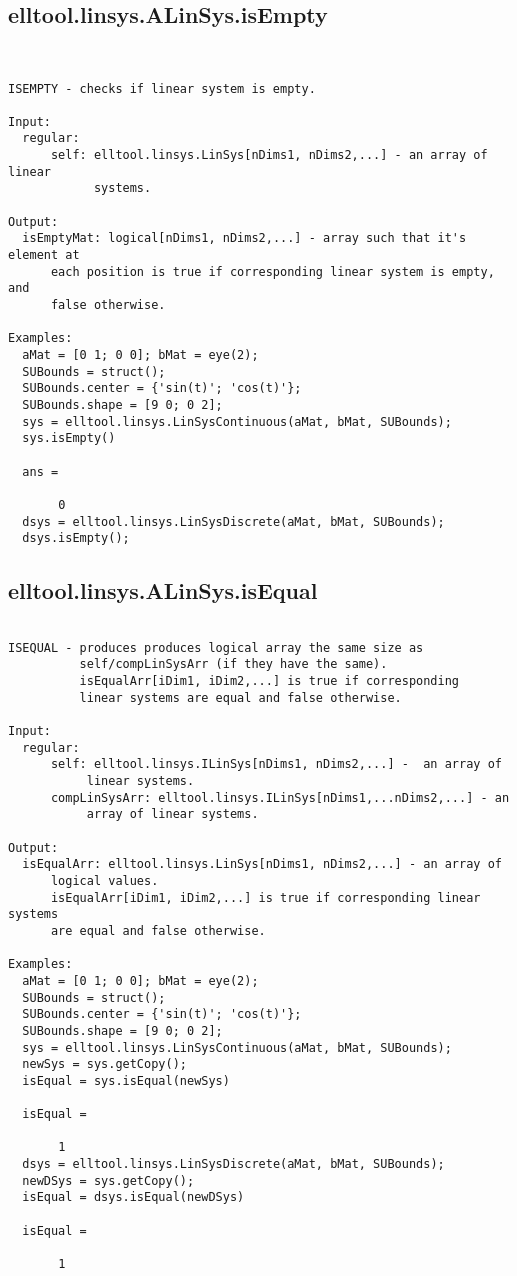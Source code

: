 \subsection{\texorpdfstring{elltool.linsys.ALinSys.isEmpty}{isEmpty}}\label{method:elltool.linsys.ALinSys.isEmpty}
\begin{verbatim}


ISEMPTY - checks if linear system is empty.

Input:
  regular:
      self: elltool.linsys.LinSys[nDims1, nDims2,...] - an array of linear
            systems.

Output:
  isEmptyMat: logical[nDims1, nDims2,...] - array such that it's element at
      each position is true if corresponding linear system is empty, and
      false otherwise.

Examples:
  aMat = [0 1; 0 0]; bMat = eye(2);
  SUBounds = struct();
  SUBounds.center = {'sin(t)'; 'cos(t)'};
  SUBounds.shape = [9 0; 0 2];
  sys = elltool.linsys.LinSysContinuous(aMat, bMat, SUBounds);
  sys.isEmpty()

  ans =

       0
  dsys = elltool.linsys.LinSysDiscrete(aMat, bMat, SUBounds);
  dsys.isEmpty();
\end{verbatim}
\subsection{\texorpdfstring{elltool.linsys.ALinSys.isEqual}{isEqual}}\label{method:elltool.linsys.ALinSys.isEqual}
\begin{verbatim}

ISEQUAL - produces produces logical array the same size as
          self/compLinSysArr (if they have the same).
          isEqualArr[iDim1, iDim2,...] is true if corresponding
          linear systems are equal and false otherwise.

Input:
  regular:
      self: elltool.linsys.ILinSys[nDims1, nDims2,...] -  an array of
           linear systems.
      compLinSysArr: elltool.linsys.ILinSys[nDims1,...nDims2,...] - an
           array of linear systems.

Output:
  isEqualArr: elltool.linsys.LinSys[nDims1, nDims2,...] - an array of
      logical values.
      isEqualArr[iDim1, iDim2,...] is true if corresponding linear systems
      are equal and false otherwise.

Examples:
  aMat = [0 1; 0 0]; bMat = eye(2);
  SUBounds = struct();
  SUBounds.center = {'sin(t)'; 'cos(t)'};
  SUBounds.shape = [9 0; 0 2];
  sys = elltool.linsys.LinSysContinuous(aMat, bMat, SUBounds);
  newSys = sys.getCopy();
  isEqual = sys.isEqual(newSys)

  isEqual =

       1
  dsys = elltool.linsys.LinSysDiscrete(aMat, bMat, SUBounds);
  newDSys = sys.getCopy();
  isEqual = dsys.isEqual(newDSys)

  isEqual =

       1
\end{verbatim}
